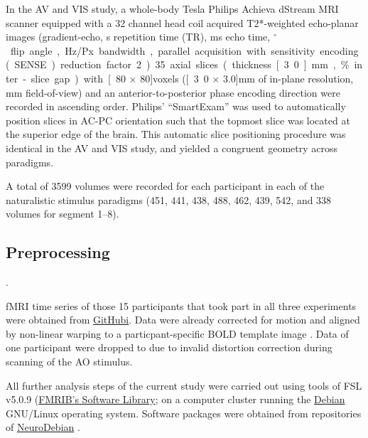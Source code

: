 \documentclass[english]{article}
\begin{document}
In the AV and VIS study, a whole-body \unit[3]{Tesla} Philips Achieva dStream
MRI scanner equipped with a 32 channel head coil acquired T2*-weighted
echo-planar images (gradient-echo, \unit[2]{s} repetition time (TR),
\unit[30]{ms} echo time, \unit[90]{$^{\circ}$} flip angle, \unit[1943]{Hz/Px}
bandwidth, parallel acquisition with sensitivity encoding (SENSE) reduction
factor 2).
35 axial slices (thickness \unit[3.0]{mm}, \unit[10]{\%} inter-slice gap) with
\unit[80 $\times$ 80]{voxels} (\unit[3.0 $\times$ 3.0]{mm} of in-plane
resolution, \unit[240]{mm} field-of-view) and an anterior-to-posterior phase
encoding direction were recorded in ascending order. Philips' ``SmartExam'' was
used to automatically position slices in AC-PC orientation such that the topmost
slice was located at the superior edge of the brain. This automatic slice
positioning procedure was identical in the AV and VIS study, and yielded a
congruent geometry across paradigms.

A total of 3599 volumes were recorded for each participant in each of the
naturalistic stimulus paradigms (451, 441, 438, 488, 462, 439, 542, and 338 volumes for segment 1–8).


\subsection{Preprocessing}

.

fMRI time series of those 15 participants that took part in all three
experiments were obtained from
\href{https://github.com/psychoinformatics-de/studyforrest-data-aligned}{GitHubi}.
Data were already corrected for motion and aligned by non-linear warping to a
particpant-specific BOLD template image \citep{sengupta2016extension}.
Data of one participant were dropped to due to invalid distortion correction
during scanning of the AO stimulus.

All further analysis steps of the current study were carried out using tools of
FSL v5.0.9 (\href{https://www.fmrib.ox.ac.uk/fsl}{FMRIB's Software
Library}; \citep{smith2004fsl} on a computer cluster running the
\href{https://www.debian.org}{Debian} GNU/Linux operating system. Software
packages were obtained from repositories of
\href{http://neuro.debian.net}{NeuroDebian} \citep{halchenko2012open}.
\end{document}
